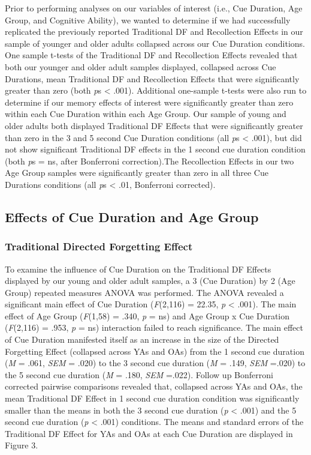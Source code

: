 \documentclass[man]{apa6}
\begin{document}
Prior to performing analyses on our variables of interest (i.e., Cue Duration, Age Group, and Cognitive Ability), we wanted to determine if we had successfully replicated the previously reported Traditional DF and Recollection Effects in our sample of younger and older adults collapsed across our Cue Duration conditions. One sample t-tests of the Traditional DF and Recollection Effects revealed that both our younger and older adult samples displayed, collapsed across Cue Durations, mean Traditional DF and Recollection Effects that were significantly greater than zero (both \textit{p}s < .001). Additional one-sample t-tests were also run to determine if our memory effects of interest were significantly greater than zero within each Cue Duration within each Age Group. Our sample of young and older adults both displayed Traditional DF Effects that were significantly greater than zero in the 3 and 5 second Cue Duration conditions (all \textit{p}s < .001), but did not show significant Traditional DF effects in the 1 second cue duration condition (both \textit{p}s = ns, after Bonferroni correction).The Recollection Effects in our two Age Group samples were significantly greater than zero in all three Cue Durations conditions (all \textit{p}s < .01, Bonferroni corrected).

\subsection*{Effects of Cue Duration and Age Group}

\subsubsection*{Traditional Directed Forgetting Effect}

To examine the influence of Cue Duration on the Traditional DF Effects displayed by our young and older adult samples, a 3 (Cue Duration) by 2 (Age Group) repeated measures ANOVA was performed. The ANOVA revealed a significant main effect of Cue Duration (\textit{F}(2,116) = 22.35, \textit{p} < .001). The main effect of Age Group (\textit{F}(1,58) = .340, \textit{p} = ns) and Age Group x Cue Duration (\textit{F}(2,116) = .953, \textit{p} = ns) interaction failed to reach significance. The main effect of Cue Duration manifested itself as an increase in the size of the Directed Forgetting Effect (collapsed across YAs and OAs) from the 1 second cue duration (\textit{M} = .061, \textit{SEM} = .020) to the 3 second cue duration (\textit{M} = .149, \textit{SEM} =.020) to the 5 second cue duration (\textit{M} = .180, \textit{SEM} =.022). Follow up Bonferroni corrected pairwise comparisons revealed that, collapsed across YAs and OAs, the mean Traditional DF Effect in 1 second cue duration condition was significantly smaller than the means in both the 3 second cue duration (\textit{p} < .001) and the 5 second cue duration (\textit{p} < .001) conditions. The means and standard errors of the Traditional DF Effect for YAs and OAs at each Cue Duration are displayed in Figure 3.
\end{document}
